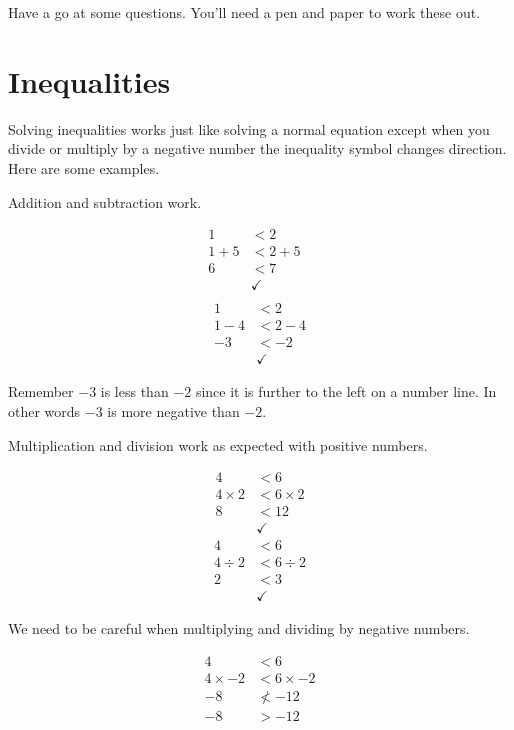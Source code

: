 \documentclass[
  a4paper,
]{scrbook}
\begin{document}
Have a go at some questions. You'll need a pen and paper to work these
out.

\section{Inequalities}\label{inequalities}

Solving inequalities works just like solving a normal equation except
when you divide or multiply by a negative number the inequality symbol
changes direction. Here are some examples.

Addition and subtraction work.

\[
\begin{aligned} 1 &< 2 \\
1 + 5 &< 2 + 5\\
6 &< 7\\
&\checkmark&\\
\end{aligned}
\] \[
\begin{aligned} 1 &< 2 \\
1 -4 &< 2 -4\\
-3 &< -2\\
&\checkmark
\end{aligned}
\]

Remember \(-3\) is less than \(-2\) since it is further to the left on a
number line. In other words \(-3\) is more negative than \(-2\).

Multiplication and division work as expected with positive numbers.

\[
\begin{aligned} 4 &< 6 \\
4 \times 2 &< 6 \times 2\\
8 &< 12\\
&\checkmark
\end{aligned}
\] \[
\begin{aligned} 4 &< 6 \\
4 \div 2 &< 6 \div 2\\
2 &< 3\\
&\checkmark
\end{aligned}
\]

We need to be careful when multiplying and dividing by negative numbers.

\[
\begin{aligned} 4 &< 6 \\
4 \times -2 &< 6 \times -2\\
-8 &\nless -12\\
-8 &> -12
\end{aligned}
\]
\end{document}
